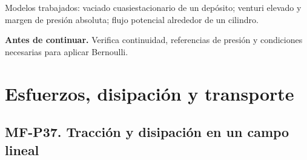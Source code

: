 \begin{tcolorbox}[studiumcheck,breakable=false,title={Síntesis y comprobación}]Modelos trabajados: vaciado cuasiestacionario de un depósito; venturi elevado y margen de presión absoluta; flujo potencial alrededor de un cilindro.\par\textbf{Antes de continuar.} Verifica continuidad, referencias de presión y condiciones necesarias para aplicar Bernoulli.\end{tcolorbox}

\chapter{Esfuerzos, disipación y transporte}


\Needspace{.30\textheight}\section{MF-P37. Tracción y disipación en un campo lineal}

